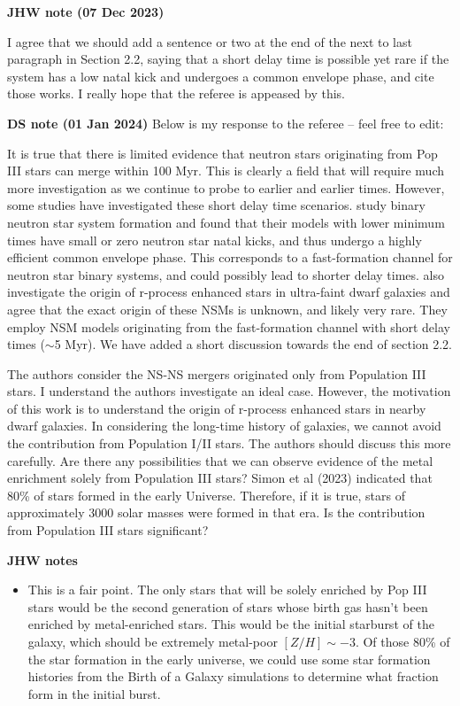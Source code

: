 \documentclass[11pt]{article}
\begin{document}
\noindent\textbf{JHW note (07 Dec 2023)}

I agree that we should add a sentence or two at the end of the next to last paragraph in Section 2.2, saying that a short delay time is possible yet rare if the system has a low natal kick and undergoes a common envelope phase, and cite those works.  I really hope that the referee is appeased by this.

\noindent\textbf{DS note (01 Jan 2024)}
Below is my response to the referee -- feel free to edit:

It is true that there is limited evidence that neutron stars originating from Pop III stars can merge within 100 Myr. This is clearly a field that will require much more investigation as we continue to probe to earlier and earlier times. However, some studies have investigated these short delay time scenarios. \citet{Belczynski18} study binary neutron star system formation and found that their models with lower minimum times have small or zero neutron star natal kicks, and thus undergo a highly efficient common envelope phase. This corresponds to a fast-formation channel for neutron star binary systems, and could possibly lead to shorter delay times. \citet{Jeon21} also investigate the origin of r-process enhanced stars in ultra-faint dwarf galaxies and agree that the exact origin of these NSMs is unknown, and likely very rare. They employ NSM models originating from the fast-formation channel with short delay times ($\sim$5 Myr). We have added a short discussion towards the end of section 2.2.



\begin{tcolorbox}[colback={lightgray}]   
    The authors consider the NS-NS mergers originated only from Population III stars. I understand the authors investigate an ideal case. However, the motivation of this work is to understand the origin of r-process enhanced stars in nearby dwarf galaxies. In considering the long-time history of galaxies, we cannot avoid the contribution from Population I/II stars. The authors should discuss this more carefully. Are there any possibilities that we can observe evidence of the metal enrichment solely from Population III stars? Simon et al (2023) indicated that 80\% of stars formed in the early Universe. Therefore, if it is true, stars of approximately 3000 solar masses were formed in that era. Is the contribution from Population III stars significant?
\end{tcolorbox}

\noindent\textbf{JHW notes}
\begin{itemize}
  \item This is a fair point.  The only stars that will be solely enriched by Pop III stars would be the second generation of stars whose birth gas hasn't been enriched by metal-enriched stars.  This would be the initial starburst of the galaxy, which should be extremely metal-poor $[Z/H] \sim -3$.  Of those 80\% of the star formation in the early universe, we could use some star formation histories from the Birth of a Galaxy simulations to determine what fraction form in the initial burst.
\end{itemize}
\end{document}
